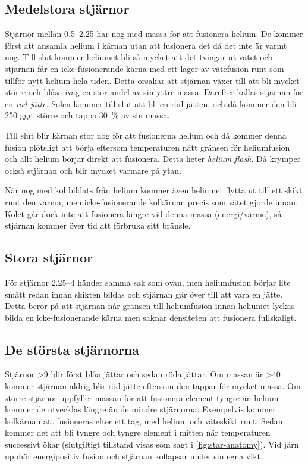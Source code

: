 \subsection{Medelstora stjärnor}
Stjärnor mellan \qtyrange{0.5}{2.25}{\Mo} har nog med massa för att fusionera helium. De kommer först att ansamla helium i kärnan utan att fusionera det då det inte är varmt nog. Till slut kommer heliumet bli så mycket att det tvingar ut vätet och stjärnan får en icke-fusionerande kärna med ett lager av vätefusion runt som tillför nytt helium hela tiden. Detta orsakar att stjärnan växer till att bli mycket större och blåsa iväg en stor andel av sin yttre massa. Därefter kallas stjärnan för en \emph{röd jätte}. Solen kommer till slut att bli en röd jätten, och då kommer den bli \num{250} ggr. större och tappa \qty{30}{\percent} av sin massa.

Till slut blir kärnan stor nog för att fusionerna helium och då kommer denna fusion plötsligt att börja eftersom temperaturen nått gränsen för heliumfusion och allt helium börjar direkt att fusionera. Detta heter \emph{helium flash}. Då krymper också stjärnan och blir mycket varmare på ytan.

När nog med kol bildats från helium kommer även heliumet flytta ut till ett skikt runt den varma, men icke-fusionerande kolkärnan precis som vätet gjorde innan. Kolet går dock inte att fusionera längre vid denna massa (energi/värme), så stjärnan kommer över tid att förbruka sitt bränsle.

\subsection{Stora stjärnor}
För stjärnor \qtyrange{2.25}{4}{\Mo} händer samma sak som ovan, men heliumfusion börjar lite smått redan innan skikten bildas och stjärnan går över till att vara en jätte. Detta beror på att stjärnan når gränsen till heliumfusion innan heliumet lyckas bilda en icke-fusionerande kärna men saknar densiteten att fusionera fullskaligt.

\subsection{De största stjärnorna}
Stjärnor \qty{>9}{\Mo} blir först blåa jättar och sedan röda jättar. Om massan är \qty{>40}{\Mo} kommer stjärnan aldrig blir röd jätte eftersom den tappar för mycket massa. Om större stjärnor uppfyller massan för att fusionera element tyngre än helium kommer de utvecklas längre än de mindre stjärnorna. Exempelvis kommer kolkärnan att fusioneras efter ett tag, med helium och väteskikt runt. Sedan kommer det att bli tyngre och tyngre element i mitten när temperaturen successivt ökar (slutgiltigt tillstånd visas som sagt i \cref{fig:star-anatomy}). Vid järn upphör energipositiv fusion och stjärnan kollapsar under sin egna vikt.

